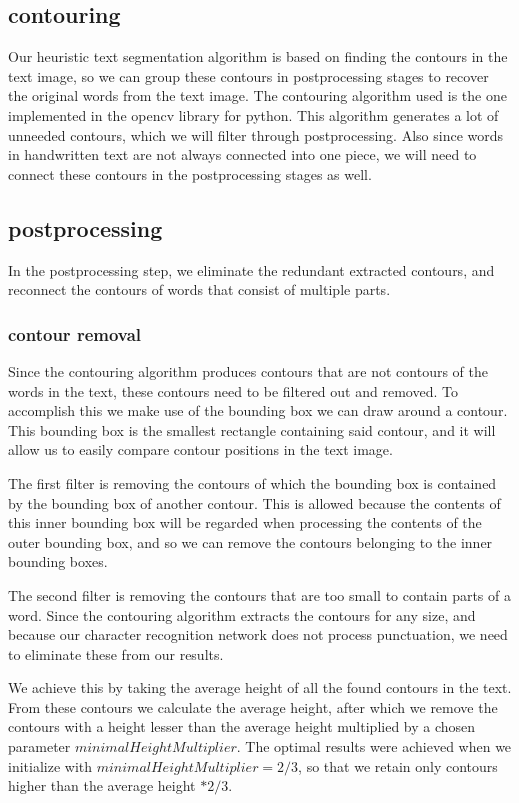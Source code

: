 \documentclass{article}
\begin{document}
\subsection{contouring}
Our heuristic text segmentation algorithm is based on finding the contours in the text image, so we can group these contours in postprocessing stages to recover the original words from the text image.
The contouring algorithm used is the one implemented in the opencv library for python.
This algorithm generates a lot of unneeded contours, which we will filter through postprocessing.
Also since words in handwritten text are not always connected into one piece, we will need to connect these contours in the postprocessing stages as well.

\subsection{postprocessing}
In the postprocessing step, we eliminate the redundant extracted contours, and reconnect the contours of words that consist of multiple parts.

\subsubsection{contour removal}
Since the contouring algorithm produces contours that are not contours of the words in the text, these contours need to be filtered out and removed.
To accomplish this we make use of the bounding box we can draw around a contour.
This bounding box is the smallest rectangle containing said contour, and it will allow us to easily compare contour positions in the text image.

The first filter is removing the contours of which the bounding box is contained by the bounding box of another contour.
This is allowed because the contents of this inner bounding box will be regarded when processing the contents of the outer bounding box, and so we can remove the contours belonging to the inner bounding boxes.

The second filter is removing the contours that are too small to contain parts of a word.
Since the contouring algorithm extracts the contours for any size, and because our character recognition network does not process punctuation, 
we need to eliminate these from our results.

We achieve this by taking the average height of all the found contours in the text.
From these contours we calculate the average height, after which we remove the contours with a height lesser than the average height multiplied by a chosen parameter $minimalHeightMultiplier$.
The optimal results were achieved when we initialize with $minimalHeightMultiplier = 2/3$, so that we retain only contours higher than the average height $ * 2/3$.
\end{document}
